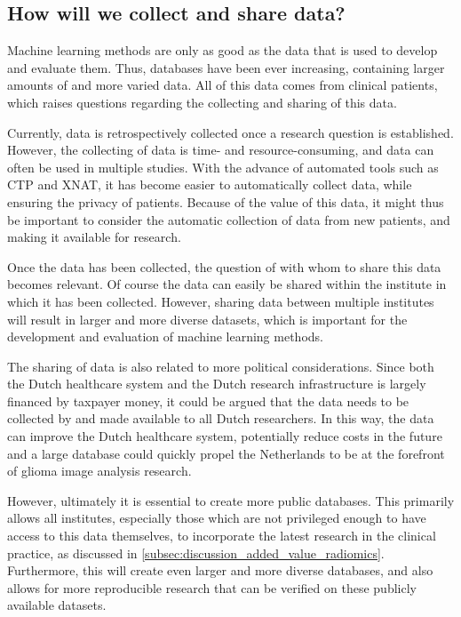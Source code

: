 \subsection{How will we collect and share data?}

Machine learning methods are only as good as the data that is used to develop and evaluate them.
Thus, databases have been ever increasing, containing larger amounts of and more varied data.
All of this data comes from clinical patients, which raises questions regarding the collecting and sharing of this data.

Currently, data is retrospectively collected once a research question is established.
However, the collecting of data is time- and resource-consuming, and data can often be used in multiple studies.
With the advance of automated tools such as CTP and XNAT, it has become easier to automatically collect data, while ensuring the privacy of patients.
Because of the value of this data, it might thus be important to consider the automatic collection of data from new patients, and making it available for research.

Once the data has been collected, the question of with whom to share this data becomes relevant.
Of course the data can easily be shared within the institute in which it has been collected.
However, sharing data between multiple institutes will result in larger and more diverse datasets, which is important for the development and evaluation of machine learning methods.

The sharing of data is also related to more political considerations.
Since both the Dutch healthcare system and the Dutch research infrastructure is largely financed by taxpayer money, it could be argued that the data needs to be collected by and made available to all Dutch researchers.
In this way, the data can improve the Dutch healthcare system, potentially reduce costs in the future and a large database could quickly propel the Netherlands to be at the forefront of glioma image analysis research.

However, ultimately it is essential to create more public databases.
This primarily allows all institutes, especially those which are not privileged enough to have access to this data themselves, to incorporate the latest research in the clinical practice, as discussed in \cref{subsec:discussion_added_value_radiomics}.
Furthermore, this will create even larger and more diverse databases, and also allows for more reproducible research that can be verified on these publicly available datasets.



